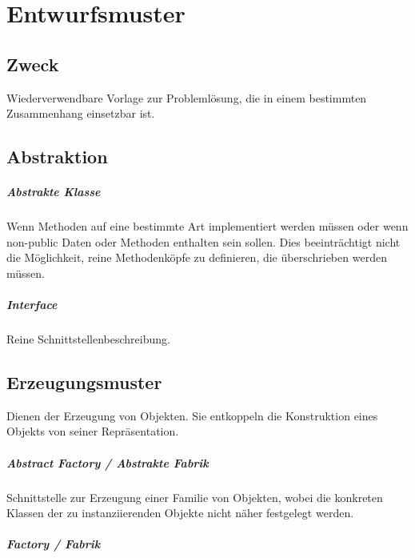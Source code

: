 \chapter{Entwurfsmuster}\label{entwurfsmuster}

\section{Zweck}\label{zweck}
Wiederverwendbare Vorlage zur Problemlösung, die in einem bestimmten
Zusammenhang einsetzbar ist.

\section{Abstraktion}\label{abstraktion}

\paragraph{Abstrakte Klasse}\label{abstrakte-klasse}

Wenn Methoden auf eine bestimmte Art implementiert werden müssen oder
wenn non-public Daten oder Methoden enthalten sein sollen. Dies
beeinträchtigt nicht die Möglichkeit, reine Methodenköpfe zu definieren,
die überschrieben werden müssen.

\paragraph{Interface}\label{interface}

Reine Schnittstellenbeschreibung.

\section{Erzeugungsmuster}\label{erzeugungsmuster}
Dienen der Erzeugung von Objekten. Sie entkoppeln die Konstruktion eines
Objekts von seiner Repräsentation.

\paragraph{Abstract Factory / Abstrakte Fabrik}\label{abstract-factory}

Schnittstelle zur Erzeugung einer Familie von Objekten, wobei die konkreten
Klassen der zu instanziierenden Objekte nicht näher festgelegt werden.

\paragraph{Factory / Fabrik}\label{factory}

